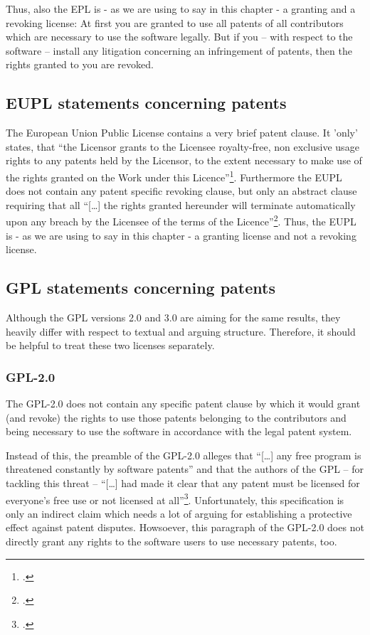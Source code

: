Thus, also the EPL is - as we are using to say in this chapter - a granting and
a revoking license: At first you are granted to use all patents of all
contributors which are necessary to use the software legally. But if you -- with
respect to the software -- install any litigation concerning an infringement of
patents, then the rights granted to you are revoked.

\subsection{EUPL statements concerning patents}\label{subsec:EupLPatentClause}
The European Union Public License contains a very brief patent clause. It 'only'
states, that \enquote{the Licensor grants to the Licensee royalty-free, non
exclusive usage rights to any patents held by the Licensor, to the extent
necessary to make use of the rights granted on the Work under this
Licence}\footcite[cf.][\nopage wp.\ §2 at its tail]{EuplLicense2007en}.
Furthermore the EUPL does not contain any patent specific revoking clause, but
only an abstract clause requiring that all \enquote{[\ldots] the rights granted
hereunder will terminate automatically upon any breach by the Licensee of the
terms of the Licence}\footcite[cf.][\nopage wp.\ §12]{EuplLicense2007en}. Thus,
the EUPL is - as we are using to say in this chapter - a granting license and
not a revoking license.

\subsection{GPL statements concerning patents}

Although the GPL versions 2.0 and 3.0 are aiming for the same results, they
heavily differ with respect to textual and arguing structure. Therefore, it
should be helpful to treat these two licenses separately.

\subsubsection {GPL-2.0} \label{subsec:Gpl20PatentClause}

The GPL-2.0 does not contain any specific patent clause by which it would grant
(and revoke) the rights to use those patents belonging to the contributors and 
being necessary to use the software in accordance with the legal patent system.

Instead of this, the preamble of the GPL-2.0 alleges that \enquote{[\ldots] any
free program is threatened constantly by software patents} and that the authors
of the GPL -- for tackling this threat -- \enquote{[\ldots] had made it clear
that any patent must be licensed for everyone's free use or not licensed at
all}\footcite[cf.][\nopage wp, Preamble]{Gpl20OsiLicense1991a}. Unfortunately,
this specification is only an indirect claim which needs a lot of arguing for
establishing a protective effect against patent disputes. Howsoever, this
paragraph of the GPL-2.0 does not directly grant any rights to the software
users to use necessary patents, too.

